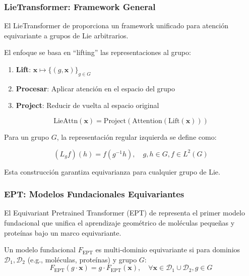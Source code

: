 \subsubsection{Lie\gls{Transformer}: Framework General}

El Lie\gls{Transformer} de \citet{hutchinson2020lietransformer} proporciona un framework unificado para atención equivariante a grupos de Lie arbitrarios.

El enfoque se basa en ``lifting'' las representaciones al grupo:

\begin{enumerate}
    \item \textbf{Lift}: $\mathbf{x} \mapsto \{(g, \mathbf{x})\}_{g \in G}$
    \item \textbf{Procesar}: Aplicar atención en el espacio del grupo
    \item \textbf{Project}: Reducir de vuelta al espacio original
\end{enumerate}

\begin{equation}
    \text{LieAttn}(\mathbf{x}) = \text{Project}(\text{Attention}(\text{Lift}(\mathbf{x})))
    \label{eq:lie_attention}
\end{equation}

Para un grupo $G$, la representación regular izquierda se define como:

\begin{equation}
    (L_g f)(h) = f(g^{-1}h), \quad g, h \in G, f \in L^2(G)
    \label{eq:left_regular_representation}
\end{equation}

Esta construcción garantiza equivarianza para cualquier grupo de Lie.

\subsubsection{EPT: Modelos Fundacionales Equivariantes}

El Equivariant Pretrained Transformer (EPT) de \citet{jiao2024ept} representa el primer modelo fundacional que unifica el aprendizaje geométrico de moléculas pequeñas y proteínas bajo un marco equivariante.

\begin{definition}
    Un modelo fundacional $F_{\text{EPT}}$ es multi-dominio equivariante si para dominios $\mathcal{D}_1, \mathcal{D}_2$ (e.g., moléculas, proteínas) y grupo $G$:
    \begin{equation}
        F_{\text{EPT}}(g \cdot \mathbf{x}) = g \cdot F_{\text{EPT}}(\mathbf{x}), \quad \forall \mathbf{x} \in \mathcal{D}_1 \cup \mathcal{D}_2, g \in G
        \label{eq:multi_domain_equivariance}
    \end{equation}
\end{definition}

